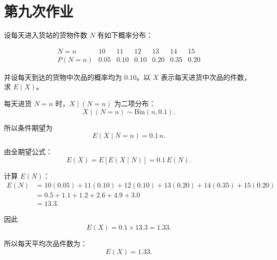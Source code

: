 \section{第九次作业}
\begin{homework}[37]
设每天进入货站的货物件数 $N$ 有如下概率分布：

\[
\begin{array}{c|cccccc}
N=n & 10 & 11 & 12 & 13 & 14 & 15 \\ \hline
P(N=n) & 0.05 & 0.10 & 0.10 & 0.20 & 0.35 & 0.20
\end{array}
\]

并设每天到达的货物中次品的概率均为 $0.10$。以 $X$ 表示每天进货中次品的件数，求 $E(X)$。
\end{homework}
\begin{solution}
每天进货 $N=n$ 时，$X\mid(N=n)$ 为二项分布：
\[
X\mid(N=n)\sim \mathrm{Bin}(n,0.1).
\]

所以条件期望为
\[
E(X\mid N=n)=0.1\,n.
\]

由全期望公式：
\[
E(X)=E\!\left[E(X\mid N)\right]
      =0.1\,E(N).
\]

计算 $E(N)$：
\[
\begin{aligned}
E(N) &=10(0.05)+11(0.10)+12(0.10)
      +13(0.20)+14(0.35)+15(0.20)\\[4pt]
     &=0.5+1.1+1.2+2.6+4.9+3.0\\
     &=13.3.
\end{aligned}
\]

因此
\[
E(X)=0.1\times 13.3=1.33.
\]

所以每天平均次品件数为：
\[
\boxed{E(X)=1.33 }.
\]
\end{solution}
